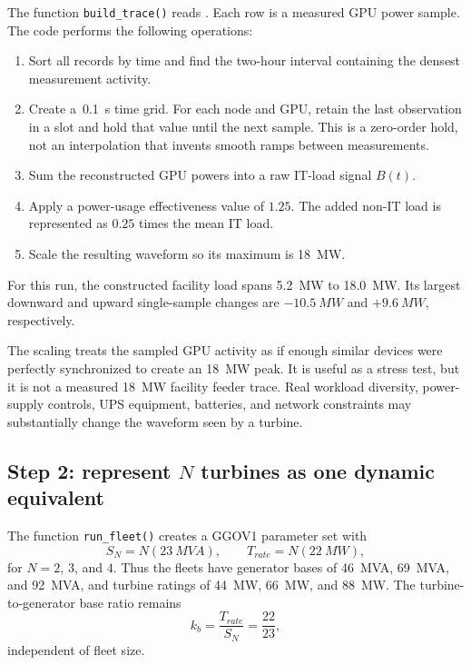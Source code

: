 \documentclass[11pt]{article}
\begin{document}
The function \texttt{build\_trace()} reads
.  Each row is a measured GPU power
sample.  The code performs the following operations:
\begin{enumerate}
  \item Sort all records by time and find the two-hour interval containing
        the densest measurement activity.
  \item Create a \,\SI{0.1}{s} time grid.  For each node and GPU, retain the
        last observation in a slot and hold that value until the next sample.
        This is a zero-order hold, not an interpolation that invents smooth
        ramps between measurements.
  \item Sum the reconstructed GPU powers into a raw IT-load signal $B(t)$.
  \item Apply a power-usage effectiveness value of $1.25$.  The added
        non-IT load is represented as $0.25$ times the mean IT load.
  \item Scale the resulting waveform so its maximum is \SI{18}{MW}.
\end{enumerate}
For this run, the constructed facility load spans \SI{5.2}{MW} to
\SI{18.0}{MW}.  Its largest downward and upward single-sample changes are
$-\SI{10.5}{MW}$ and $+\SI{9.6}{MW}$, respectively.

\begin{cautionbox}
The scaling treats the sampled GPU activity as if enough similar devices were
perfectly synchronized to create an \SI{18}{MW} peak.  It is useful as a
stress test, but it is not a measured \SI{18}{MW} facility feeder trace.
Real workload diversity, power-supply controls, UPS equipment, batteries, and
network constraints may substantially change the waveform seen by a turbine.
\end{cautionbox}

\subsection{Step 2: represent $N$ turbines as one dynamic equivalent}

The function \texttt{run\_fleet()} creates a GGOV1 parameter set with
\begin{equation}
  S_N=N(\SI{23}{MVA}), \qquad T_{rate}=N(\SI{22}{MW}),
  \label{eq:fleet-bases}
\end{equation}
for $N=2$, $3$, and $4$.  Thus the fleets have generator bases of
\SI{46}{MVA}, \SI{69}{MVA}, and \SI{92}{MVA}, and turbine ratings of
\SI{44}{MW}, \SI{66}{MW}, and \SI{88}{MW}.  The turbine-to-generator base
ratio remains
\begin{equation}
  k_b=\frac{T_{rate}}{S_N}=\frac{22}{23},
\end{equation}
independent of fleet size.
\end{document}
